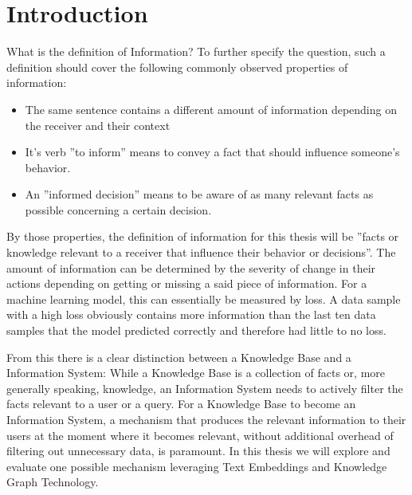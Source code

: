 \documentclass[draft,final]{vutinfth} %
\begin{document}
\mainmatter

\chapter{Introduction}

What is the definition of Information? To further specify the question, such a definition should cover the following commonly observed properties of information:
\begin{itemize}
    \item The same sentence contains a different amount of information depending on the receiver and their context
    \item It's verb ''to inform'' means to convey a fact that should influence someone's behavior.
    \item An ''informed decision'' means to be aware of as many relevant facts as possible concerning a certain decision.
\end{itemize} 
By those properties, the definition of information for this thesis will be ''facts or knowledge relevant to a receiver that influence their behavior or decisions''. The amount of information can be determined by the severity of change in their actions depending on getting or missing a said piece of information. For a machine learning model, this can essentially be measured by loss. A data sample with a high loss obviously contains more information than the last ten data samples that the model predicted correctly and therefore had little to no loss. 

From this there is a clear distinction between a Knowledge Base and a Information System: While a Knowledge Base is a collection of facts or, more generally speaking, knowledge, an Information System needs to actively filter the facts relevant to a user or a query. 
For a Knowledge Base to become an Information System, a mechanism that produces the relevant information to their users at the moment where it becomes relevant, without additional overhead of filtering out unnecessary data, is paramount. In this thesis we will explore and evaluate one possible mechanism leveraging Text Embeddings and Knowledge Graph Technology.
\end{document}
